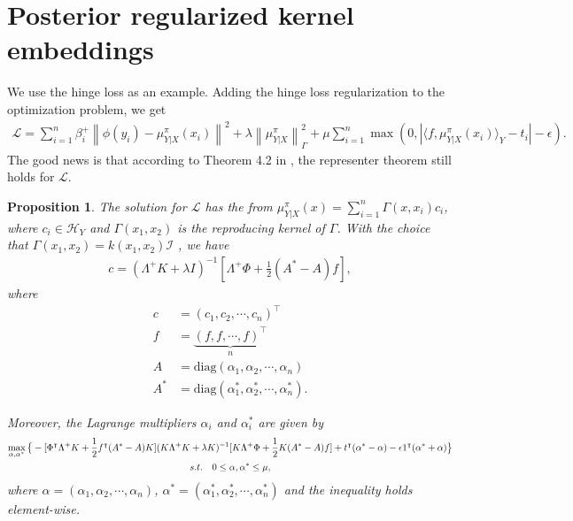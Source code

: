 \documentclass[a4paper]{article}
\newcommand{\up}{\mathrm}
\renewcommand{\cal}{\mathcal}
\newcommand{\norm}[1]{\left\lVert#1\right\rVert}
\newcommand{\T}{\intercal}
\newtheorem{proposition}{Proposition}
\begin{document}
\section{Posterior regularized kernel embeddings}
We use the hinge loss as an example. Adding the hinge loss regularization to the optimization problem, we get
\begin{align}
\cal{L} = \sum_{i=1}^{n} \beta_i^+ \norm{\phi(y_i) - \mu_{Y|X}^\pi(x_i)}^2 + \lambda\norm{\mu_{Y|X}^\pi}_\Gamma^2 + \mu \sum_{i=1}^n \max (0, |\langle f, \mu_{Y|X}^\pi(x_i)\rangle_{Y} - t_i| - \epsilon).
\end{align}
The good news is that according to Theorem 4.2 in \cite{micchelli2005learning}, the representer theorem still holds for $\cal{L}$. 
\begin{proposition}\label{prop:c}
The solution for $\cal{L}$ has the from $\mu_{Y|X}^\pi(x) = \sum_{i=1}^n \Gamma(x,x_i)c_i$, where $c_i \in \cal{H}_Y$ and $\Gamma(x_1,x_2)$ is the reproducing kernel of $\Gamma$. With the choice that $\Gamma(x_1,x_2) = k(x_1,x_2)\cal{I}$ , we have
\begin{align}
c = (\Lambda^+ K+\lambda I)^{-1}\left[\Lambda^+ \Phi + \frac{1}{2}(A^*-A)f\right],\label{eqn:cKinv}
\end{align}
where
\begin{align}
c &= (c_1,c_2,\cdots,c_n)^\T\\
f &= \underbrace{(f,f,\cdots,f)^\T}_{n}\\
A &= \up{diag}(\alpha_1,\alpha_2,\cdots,\alpha_n)\\
A^* &= \up{diag}(\alpha_1^*,\alpha_2^*,\cdots,\alpha_n^*).
\end{align}

Moreover, the Lagrange multipliers $\alpha_i$ and $\alpha_i^*$ are given by
\begin{gather}
\max_{\alpha,\alpha^*} \big\{ -[\Phi^\T \Lambda^+ K + \frac{1}{2} f^\T (A^* - A)K](K\Lambda^+ K +\lambda K)^{-1}[K\Lambda^+ \Phi + \frac{1}{2} K (A^* - A)f]+ t^\T (\alpha^* - \alpha) - \epsilon 1^\T (\alpha^* + \alpha)\big\}\label{eqn:lagmulti}\\
 s.t.\quad 0 \leq \alpha,\alpha^* \leq \mu,\notag
\end{gather}
where $\alpha = (\alpha_1,\alpha_2,\cdots,\alpha_n)$, $\alpha^* = (\alpha_1^*,\alpha_2^*,\cdots,\alpha_n^*)$ and the inequality holds element-wise.
\end{proposition}
\end{document}
